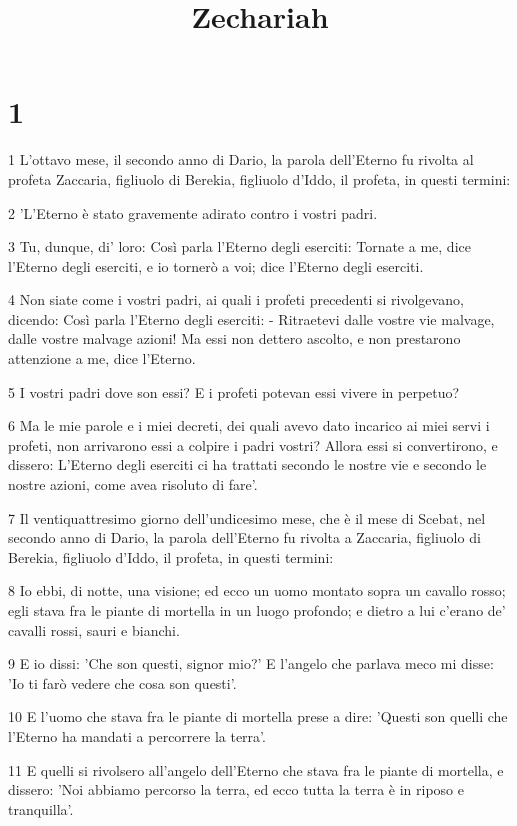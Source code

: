 

\title{Zechariah}


\chapter{1}

\par 1 L'ottavo mese, il secondo anno di Dario, la parola dell'Eterno fu rivolta al profeta Zaccaria, figliuolo di Berekia, figliuolo d'Iddo, il profeta, in questi termini:
\par 2 'L'Eterno è stato gravemente adirato contro i vostri padri.
\par 3 Tu, dunque, di' loro: Così parla l'Eterno degli eserciti: Tornate a me, dice l'Eterno degli eserciti, e io tornerò a voi; dice l'Eterno degli eserciti.
\par 4 Non siate come i vostri padri, ai quali i profeti precedenti si rivolgevano, dicendo: Così parla l'Eterno degli eserciti: - Ritraetevi dalle vostre vie malvage, dalle vostre malvage azioni! Ma essi non dettero ascolto, e non prestarono attenzione a me, dice l'Eterno.
\par 5 I vostri padri dove son essi? E i profeti potevan essi vivere in perpetuo?
\par 6 Ma le mie parole e i miei decreti, dei quali avevo dato incarico ai miei servi i profeti, non arrivarono essi a colpire i padri vostri? Allora essi si convertirono, e dissero: L'Eterno degli eserciti ci ha trattati secondo le nostre vie e secondo le nostre azioni, come avea risoluto di fare'.
\par 7 Il ventiquattresimo giorno dell'undicesimo mese, che è il mese di Scebat, nel secondo anno di Dario, la parola dell'Eterno fu rivolta a Zaccaria, figliuolo di Berekia, figliuolo d'Iddo, il profeta, in questi termini:
\par 8 Io ebbi, di notte, una visione; ed ecco un uomo montato sopra un cavallo rosso; egli stava fra le piante di mortella in un luogo profondo; e dietro a lui c'erano de' cavalli rossi, sauri e bianchi.
\par 9 E io dissi: 'Che son questi, signor mio?' E l'angelo che parlava meco mi disse: 'Io ti farò vedere che cosa son questi'.
\par 10 E l'uomo che stava fra le piante di mortella prese a dire: 'Questi son quelli che l'Eterno ha mandati a percorrere la terra'.
\par 11 E quelli si rivolsero all'angelo dell'Eterno che stava fra le piante di mortella, e dissero: 'Noi abbiamo percorso la terra, ed ecco tutta la terra è in riposo e tranquilla'.
